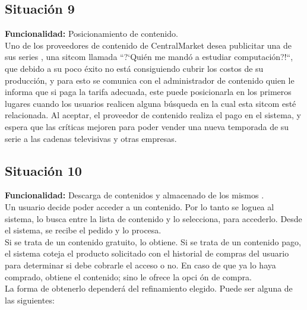 \documentclass[11pt, a4paper, spanish]{article}
\begin{document}
\subsection{Situaci\'on 9}

	\textbf{Funcionalidad:} Posicionamiento de contenido.\\

	Uno de los proveedores de contenido de CentralMarket desea publicitar una de sus series , una sitcom llamada ``?`Qui\'en me mand\'o a estudiar    
   computaci\'on?!``, que debido a su poco \'exito no est\'a consiguiendo cubrir los costos de su producci\'on, y para esto se comunica con el administrador de 
   contenido quien le informa que si paga la tarifa adecuada, este puede posicionarla en los primeros lugares cuando los usuarios realicen alguna    
   b\'usqueda en la cual esta sitcom est\'e relacionada. Al aceptar, el proveedor de contenido realiza el pago en el sistema, y espera que las cr\'iticas    
   mejoren para poder vender una nueva temporada de su serie a las cadenas televisivas y otras empresas. 


\subsection{Situaci\'on 10}

	\textbf{Funcionalidad:} Descarga de contenidos y almacenado de los mismos .\\

	Un usuario decide poder acceder a un contenido. Por lo tanto se loguea al sistema, lo busca entre la lista de contenido y lo selecciona, para 
   accederlo. Desde el sistema, se recibe el pedido y lo procesa.\\

       Si se trata de un contenido gratuito, lo obtiene. Si se trata de un contenido pago, el sistema coteja el producto solicitado con el historial de 
   compras del usuario para determinar si debe cobrarle el acceso o no. En caso de que ya lo haya comprado, obtiene el contenido; sino le ofrece la opci
   \'on de compra.\\
   La forma de obtenerlo depender\'a del refinamiento elegido. Puede ser alguna de las siguientes:
\end{document}
